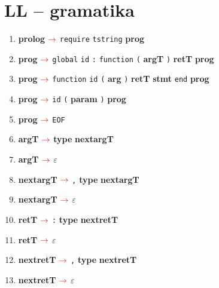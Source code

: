 \documentclass[a4paper, 11pt]{article}
\def\nonterm #1{\boldmath{$<$}\textbf{#1}\boldmath{$>$}\space}
\def\term #1{\texttt{#1}\space}
\newcommand{\arrow} {$\color{red} \rightarrow$\space}
\newcommand{\unsc} {\underline{\hspace{0.2cm}}}
\begin{document}
    \section*{LL -- gramatika}
    \begin{enumerate}[label=\textcolor{red}{\arabic*.}]
        \item \nonterm{prolog} \arrow{} \term{require} \term{t\unsc{}string} \nonterm{prog}

        \item \nonterm{prog} \arrow{} \term{global} \term{id} \term{:} \term{function} \term{(} \nonterm{arg\unsc{}T} \term{)} \nonterm{ret\unsc{}T} \nonterm{prog}

        \item \nonterm{prog} \arrow{} \term{function} \term{id} \term{(} \nonterm{arg} \term{)} \nonterm{ret\unsc{}T} \nonterm{stmt} \term{end} \nonterm{prog}

        \item \nonterm{prog} \arrow{} \term{id} \term{(} \nonterm{param} \term{)} \nonterm{prog}
        \item \nonterm{prog} \arrow{} \term{EOF}

        \item \nonterm{arg\unsc{}T} \arrow{} \nonterm{type} \nonterm{next\unsc{}arg\unsc{}T}
        \item \nonterm{arg\unsc{}T} \arrow{} \term{$\varepsilon$}

        \item \nonterm{next\unsc{}arg\unsc{}T} \arrow{} \term{,} \nonterm{type} \nonterm{next\unsc{}arg\unsc{}T}

        \item \nonterm{next\unsc{}arg\unsc{}T} \arrow{} \term{$\varepsilon$}

        \item \nonterm{ret\unsc{}T} \arrow{} \term{:} \nonterm{type} \nonterm{next\unsc{}ret\unsc{}T}

        \item \nonterm{ret\unsc{}T} \arrow{} \term{$\varepsilon$}

        \item \nonterm{next\unsc{}ret\unsc{}T} \arrow{} \term{,} \nonterm{type} \nonterm{next\unsc{}ret\unsc{}T}

        \item \nonterm{next\unsc{}ret\unsc{}T} \arrow{} \term{$\varepsilon$}


\end{enumerate}
\end{document}
